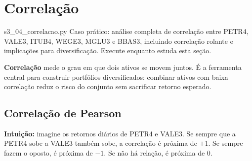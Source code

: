 \documentclass[11pt,a4paper]{article}
\theoremstyle{quant}
\begin{document}
\newpage

\section{Correlação}
\label{sec:correlacao}

\begin{caixapy}{s3\_04\_correlacao.py}
  Caso prático: análise completa de correlação entre PETR4, VALE3, ITUB4, WEGE3,
  MGLU3 e BBAS3, incluindo correlação rolante e implicações para diversificação.
  Execute enquanto estuda esta seção.
\end{caixapy}

\textbf{Correlação} mede o grau em que dois ativos se movem juntos. É a ferramenta
central para construir portfólios diversificados: combinar ativos com baixa correlação
reduz o risco do conjunto sem sacrificar retorno esperado.

\subsection{Correlação de Pearson}

\textbf{Intuição:} imagine os retornos diários de PETR4 e VALE3. Se sempre que a
PETR4 sobe a VALE3 também sobe, a correlação é próxima de $+1$. Se sempre fazem
o oposto, é próxima de $-1$. Se não há relação, é próxima de $0$.
\end{document}
